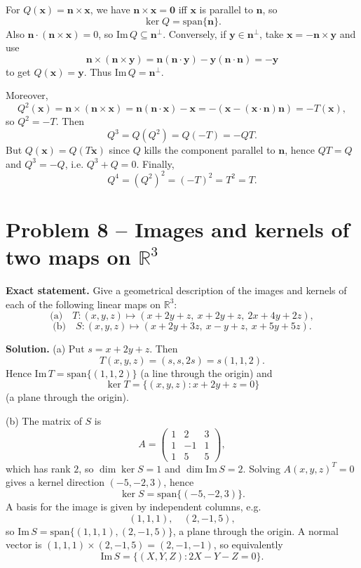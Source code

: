 \documentclass[12pt,a4paper]{article}
\theoremstyle{plain}
\theoremstyle{definition}      %
\begin{document}
For $Q(\mathbf x)=\mathbf n\times\mathbf x$, we have $\mathbf n\times\mathbf x=\mathbf 0$ iff $\mathbf x$ is parallel to $\mathbf n$, so
\[
\ker Q=\mathrm{span}\{\mathbf n\}.
\]
Also $\mathbf n\cdot(\mathbf n\times\mathbf x)=0$, so $\mathrm{Im}\,Q\subseteq \mathbf n^\perp$. Conversely, if $\mathbf y\in\mathbf n^\perp$, take $\mathbf x=-\mathbf n\times\mathbf y$ and use
\[
\mathbf n\times(\mathbf n\times\mathbf y)=\mathbf n(\mathbf n\cdot\mathbf y)-\mathbf y(\mathbf n\cdot\mathbf n)=-\mathbf y
\]
to get $Q(\mathbf x)=\mathbf y$. Thus $\mathrm{Im}\,Q=\mathbf n^\perp$.

Moreover,
\[
Q^2(\mathbf x)=\mathbf n\times(\mathbf n\times\mathbf x)=\mathbf n(\mathbf n\cdot\mathbf x)-\mathbf x
=-(\mathbf x-(\mathbf x\cdot\mathbf n)\mathbf n)=-T(\mathbf x),
\]
so $Q^2=-T$. Then
\[
Q^3=Q(Q^2)=Q(-T)=-QT.
\]
But $Q(\mathbf x)=Q(T\mathbf x)$ since $Q$ kills the component parallel to $\mathbf n$, hence $QT=Q$ and $Q^3=-Q$, i.e. $Q^3+Q=0$.
Finally,
\[
Q^4=(Q^2)^2=(-T)^2=T^2=T.
\]

\section*{Problem 8 -- Images and kernels of two maps on $\mathbb R^3$}

\textbf{Exact statement.}
Give a geometrical description of the images and kernels of each of the following linear maps on $\mathbb R^3$:
\[
\text{(a)}\quad T:(x,y,z)\mapsto (x+2y+z,\ x+2y+z,\ 2x+4y+2z),
\]
\[
\text{(b)}\quad S:(x,y,z)\mapsto (x+2y+3z,\ x-y+z,\ x+5y+5z).
\]

\textbf{Solution.}
(a) Put $s=x+2y+z$. Then
\[
T(x,y,z)=(s,s,2s)=s(1,1,2).
\]
Hence $\mathrm{Im}\,T=\mathrm{span}\{(1,1,2)\}$ (a line through the origin) and
\[
\ker T=\{(x,y,z):x+2y+z=0\}
\]
(a plane through the origin).

(b) The matrix of $S$ is
\[
A=\begin{pmatrix}1&2&3\\ 1&-1&1\\ 1&5&5\end{pmatrix},
\]
which has rank $2$, so $\dim\ker S=1$ and $\dim\mathrm{Im}\,S=2$.
Solving $A(x,y,z)^T=0$ gives a kernel direction $(-5,-2,3)$, hence
\[
\ker S=\mathrm{span}\{(-5,-2,3)\}.
\]
A basis for the image is given by independent columns, e.g.
\[
(1,1,1),\quad (2,-1,5),
\]
so $\mathrm{Im}\,S=\mathrm{span}\{(1,1,1),(2,-1,5)\}$, a plane through the origin.
A normal vector is $(1,1,1)\times(2,-1,5)=(2,-1,-1)$, so equivalently
\[
\mathrm{Im}\,S=\{(X,Y,Z):2X-Y-Z=0\}.
\]
\end{document}
